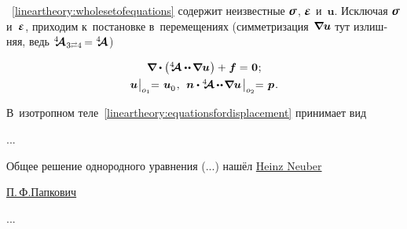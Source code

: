 \begin{otherlanguage}{russian}

~\eqref{lineartheory:wholesetofequations} содержит неизвестные $\linearstress$, $\mathboldepsilon$ и~$\bm{u}$. Исключая $\linearstress$ и~$\mathboldepsilon$, приходим к~постановке в~перемещениях (симметризация~${\hspace{-0.2ex} \bm{\nabla}\hspace{-0.2ex} \bm{u}}$ тут излишняя, ведь ${\stiffnesstensor_{\hspace{.12ex} 3 \scalebox{0.6}[0.8]{$\rightleftarrows$} 4} \hspace{-0.2ex} = \stiffnesstensor}$)

\nopagebreak\vspace{-0.1em}\begin{equation}\label{lineartheory:equationsfordisplacement}
\begin{array}{c}
\boldnabla \dotp \left( \stiffnesstensor \dotdotp \hspace{-0.12ex} \boldnabla \bm{u} \hspace{.1ex} \right) + \hspace{.1ex} \bm{f} = \hspace{.1ex} \bm{0} \hspace{.1ex}; \\[.4em]
\bm{u} \hspace{.1ex} \bigr|_{o_1} \hspace{-0.64ex} = \hspace{0.2ex} \bm{u}_{\raisemath{-0.1em}{0}} \hspace{.16ex} , \:\:
\bm{n} \dotp %
\stiffnesstensor \hspace{-0.08ex} \dotdotp \hspace{-0.24ex} \boldnabla \bm{u}
\hspace{0.25ex} \bigr|_{o_2} \hspace{-0.64ex} = \hspace{0.2ex} \bm{p} \hspace{.16ex} .
\end{array}
\end{equation}%


В~изотропном теле~\eqref{lineartheory:equationsfordisplacement} принимает вид

...

Общее решение однородного уравнения (...) нашёл \href{https://de.wikipedia.org/wiki/Heinz_Neuber}{Heinz Neuber}

\href{https://ru.wikipedia.org/wiki/%D0%9F%D0%B0%D0%BF%D0%BA%D0%BE%D0%B2%D0%B8%D1%87,_%D0%9F%D1%91%D1%82%D1%80_%D0%A4%D1%91%D0%B4%D0%BE%D1%80%D0%BE%D0%B2%D0%B8%D1%87}{П.\,Ф.\:Папкович}

...



\end{otherlanguage}

